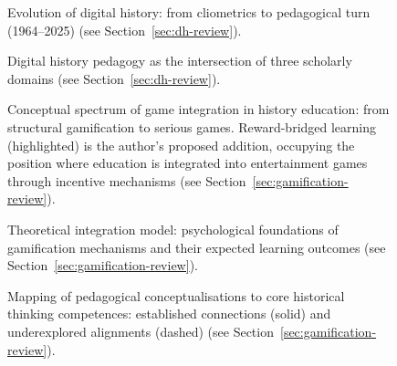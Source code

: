 
\begin{figure}[!h]
\centering

\caption{Evolution of digital history: from cliometrics to pedagogical turn (1964--2025) (see Section~\ref{sec:dh-review}).}
\label{fig:dh-timeline}
\end{figure}

\begin{figure}[!h]
\centering

\caption{Digital history pedagogy as the intersection of three scholarly domains (see Section~\ref{sec:dh-review}).}
\label{fig:dh-venn}
\end{figure}

\begin{figure}[!h]
\centering
\resizebox{\textwidth}{!}{}
\caption{Conceptual spectrum of game integration in history education: from structural gamification to serious games. Reward-bridged learning (highlighted) is the author's proposed addition, occupying the position where education is integrated into entertainment games through incentive mechanisms (see Section~\ref{sec:gamification-review}).}
\label{fig:gamification-spectrum}
\end{figure}

\begin{figure}[!h]
\centering
\resizebox{\textwidth}{!}{}
\caption{Theoretical integration model: psychological foundations of gamification mechanisms and their expected learning outcomes (see Section~\ref{sec:gamification-review}).}
\label{fig:gamification-theory}
\end{figure}

\begin{figure}[!h]
\centering
\resizebox{\textwidth}{!}{}
\caption{Mapping of pedagogical conceptualisations to core historical thinking competences: established connections (solid) and underexplored alignments (dashed) (see Section~\ref{sec:gamification-review}).}
\label{fig:pedagogical-disciplinary-gap}
\end{figure}








